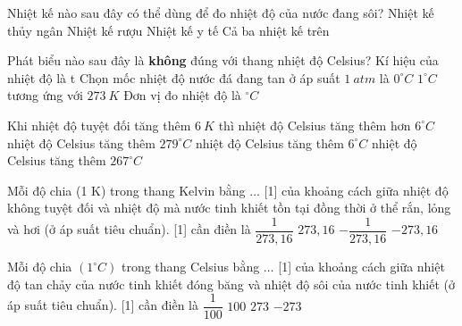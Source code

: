 \begin{ex} 
	Nhiệt kế nào sau đây có thể dùng để đo nhiệt độ của nước đang sôi?
	\choice
	{\True Nhiệt kế thủy ngân}
	{Nhiệt kế rượu}
	{Nhiệt kế y tế}
	{Cả ba nhiệt kế trên}
	
\end{ex}
\begin{ex} 
	Phát biểu nào sau đây là \textbf{không} đúng với thang nhiệt độ Celsius?
	\choice
	{Kí hiệu của nhiệt độ là t}
	{Chọn mốc nhiệt độ nước đá đang tan ở áp suất $1 \ atm$ là $0^\circ C$}
	{\True $1^\circ C$ tương ứng với $273 \ K$}
	{Đơn vị đo nhiệt độ là ${}^\circ C$}
	
\end{ex}



\begin{ex} 
	Khi nhiệt độ tuyệt đối tăng thêm $6 \ K$ thì
	\choice
	{nhiệt độ Celsius tăng thêm hơn $6^\circ C$}
	{nhiệt độ Celsius tăng thêm $279^\circ C$}
	{\True nhiệt độ Celsius tăng thêm $6^\circ C$}
	{nhiệt độ Celsius tăng thêm $267^\circ C$}
	
\end{ex}






\begin{ex} 
	Mỗi độ chia (1 K) trong thang Kelvin bằng $\ldots$ [1] của khoảng cách giữa nhiệt độ không tuyệt đối và nhiệt độ mà nước tinh khiết tồn tại đồng thời ở thể rắn, lỏng và hơi (ở áp suất tiêu chuẩn). [1] cần điền là
	\choice
	{\True $\dfrac{1}{273,16}$}
	{$273,16$}
	{$-\dfrac{1}{273,16}$}
	{$-273,16$}
	
\end{ex}

\begin{ex} 
	Mỗi độ chia $\left(1^\circ C\right)$ trong thang Celsius bằng $\ldots$ [1] của khoảng cách giữa nhiệt độ tan chảy của nước tinh khiết đóng băng và nhiệt độ sôi của nước tinh khiết (ở áp suất tiêu chuẩn). [1] cần điền là
	\choice
	{\True $\dfrac{1}{100}$}
	{$100$}
	{$273$}
	{$-273$}
	
\end{ex}

